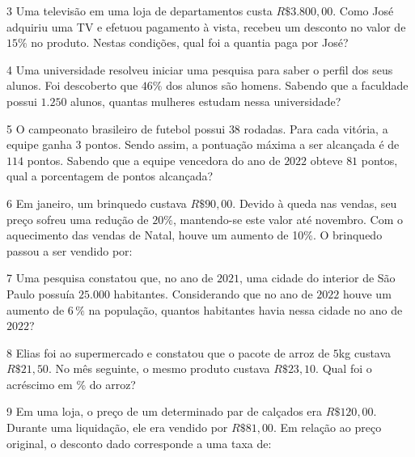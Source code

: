 {

\num{3}  Uma televisão em uma loja de departamentos custa $R\$3.800,00$. Como José adquiriu uma TV e efetuou pagamento à vista, recebeu um
desconto no valor de $15\%$ no produto. Nestas condições, qual foi a
quantia paga por José?


\num{4}  Uma universidade resolveu iniciar uma pesquisa para saber o perfil
dos seus alunos. Foi descoberto que $46\%$ dos alunos são homens. Sabendo
que a faculdade possui $1.250$ alunos, quantas mulheres estudam nessa
universidade?


\num{5}  O campeonato brasileiro de futebol possui $38$ rodadas. Para cada
vitória, a equipe ganha $3$ pontos. Sendo assim, a pontuação máxima a ser
alcançada é de $114$ pontos. Sabendo que a equipe vencedora do ano de $2022$
obteve $81$ pontos, qual a porcentagem de pontos alcançada?


\num{6}  Em janeiro, um brinquedo custava $R\$90,00$. Devido à queda nas
vendas, seu preço sofreu uma redução de $20\%$, mantendo-se este valor até
novembro. Com o aquecimento das vendas de Natal, houve um aumento de
10\%. O brinquedo passou a ser vendido por:


\num{7}  Uma pesquisa constatou que, no ano de $2021$, uma cidade do interior de
São Paulo possuía $25.000$ habitantes. Considerando que no ano de $2022$
houve um aumento de $6\,\%$ na população, quantos habitantes havia nessa
cidade no ano de $2022$?


\num{8}  Elias foi ao supermercado e constatou que o pacote de arroz de $5$kg
custava $R\$21,50$. No mês seguinte, o mesmo produto custava $R\$23,10$.
Qual foi o acréscimo em \% do arroz?


\num{9}  Em uma loja, o preço de um determinado par de calçados era
$R\$120,00$. Durante uma liquidação, ele era vendido por $R\$81,00$. Em
relação ao preço original, o desconto dado corresponde a uma taxa de:

}
